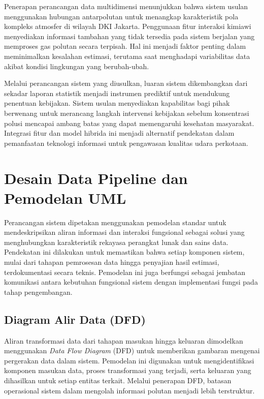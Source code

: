 Penerapan perancangan data multidimensi menunjukkan bahwa sistem usulan menggunakan hubungan antarpolutan untuk menangkap karakteristik pola kompleks atmosfer di wilayah DKI Jakarta. Penggunaan fitur interaksi kimiawi menyediakan informasi tambahan yang tidak tersedia pada sistem berjalan yang memproses gas polutan secara terpisah. Hal ini menjadi faktor penting dalam meminimalkan kesalahan estimasi, terutama saat menghadapi variabilitas data akibat kondisi lingkungan yang berubah-ubah.

Melalui perancangan sistem yang diusulkan, luaran sistem dikembangkan dari sekadar laporan statistik menjadi instrumen prediktif untuk mendukung penentuan kebijakan. Sistem usulan menyediakan kapabilitas bagi pihak berwenang untuk merancang langkah intervensi kebijakan sebelum konsentrasi polusi mencapai ambang batas yang dapat memengaruhi kesehatan masyarakat. Integrasi fitur dan model hibrida ini menjadi alternatif pendekatan dalam pemanfaatan teknologi informasi untuk pengawasan kualitas udara perkotaan.

\section{Desain Data Pipeline dan Pemodelan UML}

Perancangan sistem dipetakan menggunakan pemodelan standar untuk mendeskripsikan aliran informasi dan interaksi fungsional sebagai solusi yang menghubungkan karakteristik rekayasa perangkat lunak dan sains data. Pendekatan ini dilakukan untuk memastikan bahwa setiap komponen sistem, mulai dari tahapan pemrosesan data hingga penyajian hasil estimasi, terdokumentasi secara teknis. Pemodelan ini juga berfungsi sebagai jembatan komunikasi antara kebutuhan fungsional sistem dengan implementasi fungsi pada tahap pengembangan.

\subsection{Diagram Alir Data (DFD)}

Aliran transformasi data dari tahapan masukan hingga keluaran dimodelkan menggunakan \textit{Data Flow Diagram} (DFD) untuk memberikan gambaran mengenai pergerakan data dalam sistem. Pemodelan ini digunakan untuk mengidentifikasi komponen masukan data, proses transformasi yang terjadi, serta keluaran yang dihasilkan untuk setiap entitas terkait. Melalui penerapan DFD, batasan operasional sistem dalam mengolah informasi polutan menjadi lebih terstruktur.

